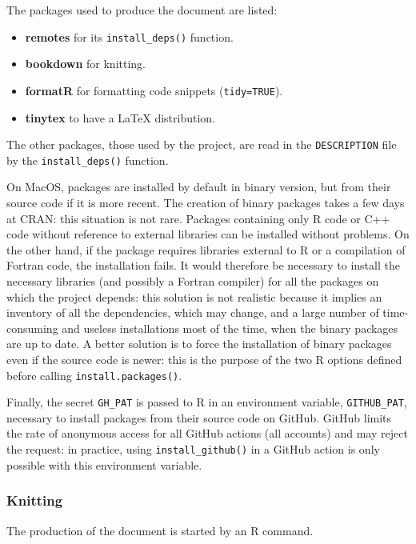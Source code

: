 \documentclass[
  12pt,
  american,
  a4paper,
  extrafontsizes,onecolumn,openright
  ]{memoir}
\providecommand{\tightlist}{%
  \setlength{\itemsep}{0pt}\setlength{\parskip}{0pt}}
\begin{document}
The packages used to produce the document are listed:

\begin{itemize}
\tightlist
\item
  \textbf{remotes} for its \texttt{install\_deps()} function.
\item
  \textbf{bookdown} for knitting.
\item
  \textbf{formatR} for formatting code snippets (\texttt{tidy=TRUE}).
\item
  \textbf{tinytex} to have a LaTeX distribution.
\end{itemize}

The other packages, those used by the project, are read in the \texttt{DESCRIPTION} file by the \texttt{install\_deps()} function.

On MacOS, packages are installed by default in binary version, but from their source code if it is more recent.
The creation of binary packages takes a few days at CRAN: this situation is not rare.
Packages containing only R code or C++ code without reference to external libraries can be installed without problems.
On the other hand, if the package requires libraries external to R or a compilation of Fortran code, the installation fails.
It would therefore be necessary to install the necessary libraries (and possibly a Fortran compiler) for all the packages on which the project depends: this solution is not realistic because it implies an inventory of all the dependencies, which may change, and a large number of time-consuming and useless installations most of the time, when the binary packages are up to date.
A better solution is to force the installation of binary packages even if the source code is newer: this is the purpose of the two R options defined before calling \texttt{install.packages()}.

Finally, the secret \texttt{GH\_PAT} is passed to R in an environment variable, \texttt{GITHUB\_PAT}, necessary to install packages from their source code on GitHub.
GitHub limits the rate of anonymous access for all GitHub actions (all accounts) and may reject the request: in practice, using \texttt{install\_github()} in a GitHub action is only possible with this environment variable.

\subsubsection{Knitting}\label{knitting}

The production of the document is started by an R command.
\end{document}
